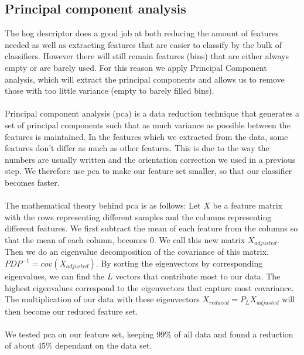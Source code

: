 \documentclass[%
        compressed,
        final,
        notitlepage,
        narroweqnarray,
        inline,
        twoside,
        ]{ieee}
\begin{document}
\subsection{Principal component analysis}
The hog descriptor does a good job at both reducing the amount of features needed as well as extracting features that are easier to classify by the bulk of classifiers. However there will still remain features (bins) that are either always empty or are barely used. For this reason we apply Principal Component analysis, which will extract the principal components and allows us to remove those with too little variance (empty to barely filled bins).\\\\
Principal component analysis (pca) is a data reduction technique that generates a set of
principal components such that as much variance as possible between the features is maintained.  In the features which we extracted from the data, some features don't differ as much as other features. This is due to the way the numbers are usually written and the orientation correction we used in a previous step. We therefore use pca to make our feature set smaller, so that our classifier becomes faster.\\\\
The mathematical theory behind pca is as follows:
Let $X$ be a feature matrix with the rows representing different samples and the
columns representing different features.  We first subtract the mean of each
feature from the columns so that the mean of each column, becomes 0. We call
this new matrix $X_{adjusted}$. Then we do an eigenvalue decomposition of the
covariance of this matrix. $PDP^{-1}=cov(X_{adjusted})$. By sorting the
eigenvectors by corresponding eigenvalues, we can find the $L$ vectors that
contribute most to our data.  The highest eigenvalues correspond to the
eigenvectors that capture most covariance. The multiplication of our data with
these eigenvectors $X_{reduced}=P_L X_{adjusted}$ will then become our reduced feature set.
\cite{Pearson}\\\\
We tested pca on our feature set, keeping 99\% of all data and found a reduction
of about 45\% dependant on the data set. 
\end{document}
